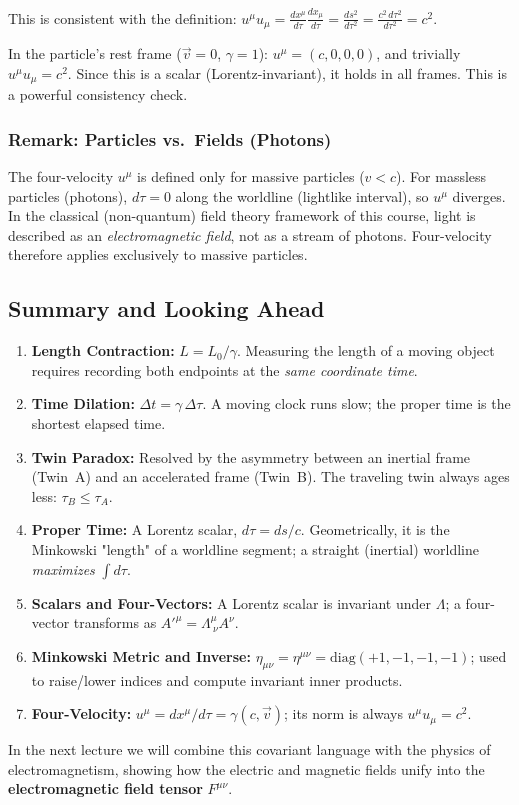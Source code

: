This is consistent with the definition: $u^\mu u_\mu = \frac{dx^\mu}{d\tau}\frac{dx_\mu}{d\tau} = \frac{ds^2}{d\tau^2} = \frac{c^2\,d\tau^2}{d\tau^2} = c^2$.

In the particle's rest frame ($\vec{v} = 0$, $\gamma = 1$): $u^\mu = (c, 0, 0, 0)$, and trivially $u^\mu u_\mu = c^2$. Since this is a scalar (Lorentz-invariant), it holds in all frames. This is a powerful consistency check.

\subsubsection*{Remark: Particles vs.\ Fields (Photons)}

The four-velocity $u^\mu$ is defined only for massive particles ($v < c$). For massless particles (photons), $d\tau = 0$ along the worldline (lightlike interval), so $u^\mu$ diverges. In the classical (non-quantum) field theory framework of this course, light is described as an \emph{electromagnetic field}, not as a stream of photons. Four-velocity therefore applies exclusively to massive particles.

\subsection*{Summary and Looking Ahead}

\begin{enumerate}
    \item \textbf{Length Contraction:} $L = L_0/\gamma$. Measuring the length of a moving object requires recording both endpoints at the \emph{same coordinate time}.
    \item \textbf{Time Dilation:} $\Delta t = \gamma\,\Delta\tau$. A moving clock runs slow; the proper time is the shortest elapsed time.
    \item \textbf{Twin Paradox:} Resolved by the asymmetry between an inertial frame (Twin~A) and an accelerated frame (Twin~B). The traveling twin always ages less: $\tau_B \leq \tau_A$.
    \item \textbf{Proper Time:} A Lorentz scalar, $d\tau = ds/c$. Geometrically, it is the Minkowski "length" of a worldline segment; a straight (inertial) worldline \emph{maximizes} $\int d\tau$.
    \item \textbf{Scalars and Four-Vectors:} A Lorentz scalar is invariant under $\Lambda$; a four-vector transforms as $A'^\mu = \Lambda^\mu_{\ \nu}A^\nu$.
    \item \textbf{Minkowski Metric and Inverse:} $\eta_{\mu\nu} = \eta^{\mu\nu} = \text{diag}(+1,-1,-1,-1)$; used to raise/lower indices and compute invariant inner products.
    \item \textbf{Four-Velocity:} $u^\mu = dx^\mu/d\tau = \gamma(c,\vec{v})$; its norm is always $u^\mu u_\mu = c^2$.
\end{enumerate}

In the next lecture we will combine this covariant language with the physics of electromagnetism, showing how the electric and magnetic fields unify into the \textbf{electromagnetic field tensor} $F^{\mu\nu}$.
